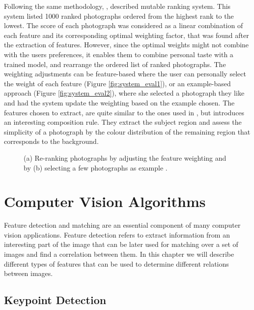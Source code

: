 Following the same methodology, \citeauthor{yeh2010personalized} \cite{yeh2010personalized}, described mutable ranking system. This system listed 1000 ranked photographs ordered from the highest rank to the lowest. The score of each photograph was considered as a linear combination of each feature and its corresponding optimal weighting factor, that was found after the extraction of features. However, since the optimal weights might not combine with the users preferences, it enables them to combine personal taste with a trained model, and rearrange the ordered list of ranked photographs.
The weighting adjustments can be feature-based where the user can personally select the weight of each feature (Figure \ref{fig:system_eval1}), or an example-based approach (Figure \ref{fig:system_eval2}), where she selected a photograph they like and had the system update the weighting based on the example chosen.
The features chosen to extract, are quite similar to the ones used in \cite{datta2006studying}, but introduces an interesting composition rule. They extract the subject region and assess the simplicity of a photograph by the colour distribution of the remaining region that corresponds to the background.

\begin{figure}[htbp]
    \centering
  \caption{(a) Re-ranking photographs by adjusting the feature weighting and by (b) selecting a few photographs as example \cite{yeh2010personalized}.}
  \label{fig:system_eval_image}
\end{figure}

\section{Computer Vision Algorithms}

Feature detection and matching are an essential component of many computer vision applications. Feature detection refers to extract information from an interesting part of the image that can be later used for matching over a set of images and find a correlation between them. In this chapter we will describe different types of features that can be used to determine different relations between images.

\subsection{Keypoint Detection}
\label{sub:keypoint}

